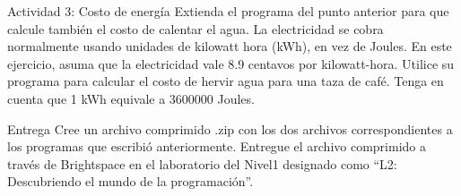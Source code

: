 \documentclass{isis-lab}
\begin{document}
\begin{sectionbox}{Actividad 3: Costo de energía}
Extienda el programa del punto anterior para que calcule también el costo de calentar el agua. La electricidad se cobra normalmente usando unidades de kilowatt hora (kWh), en vez de Joules. En este ejercicio, asuma que la electricidad vale 8.9 centavos por kilowatt-hora. Utilice su programa para calcular el costo de hervir agua para una taza de café. Tenga en cuenta que 1 kWh equivale a 3600000 Joules.
\end{sectionbox}

\begin{sectionbox}{Entrega}
Cree un archivo comprimido .zip con los dos archivos correspondientes a los programas que escribió anteriormente. Entregue el archivo comprimido a través de Brightspace en el laboratorio del Nivel1 designado como ``L2: Descubriendo el mundo de la programación''.
\end{sectionbox}
\end{document}
